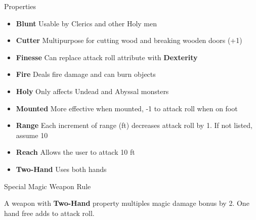 \begin{multicols}{2}
\begin{mercHeading}
Properties
\end{mercHeading}
\begin{itemize}
\setlength\itemsep{0em}
	\item \textbf{Blunt} Usable by Clerics and other Holy men
	\item \textbf{Cutter} Multipurpose for cutting wood and breaking wooden doors (+1)
	\item \textbf{Finesse} Can replace attack roll attribute with \textbf{Dexterity}
	\item \textbf{Fire} Deals fire damage and can burn objects
	\item \textbf{Holy} Only affects Undead and Abyssal monsters
	\item \textbf{Mounted} More effective when mounted, -1 to attack roll when on foot
	\item \textbf{Range} Each increment of range (ft) decreases attack roll by 1. If not listed, assume 10
	\item \textbf{Reach} Allows the user to attack 10 ft
	\item \textbf{Two-Hand} Uses both hands
\end{itemize}
\begin{mercHeading}
Special Magic Weapon Rule
\end{mercHeading}
A weapon with \textbf{Two-Hand} property multiples magic damage bonus by 2. One hand free adds to attack roll.

\end{multicols}
